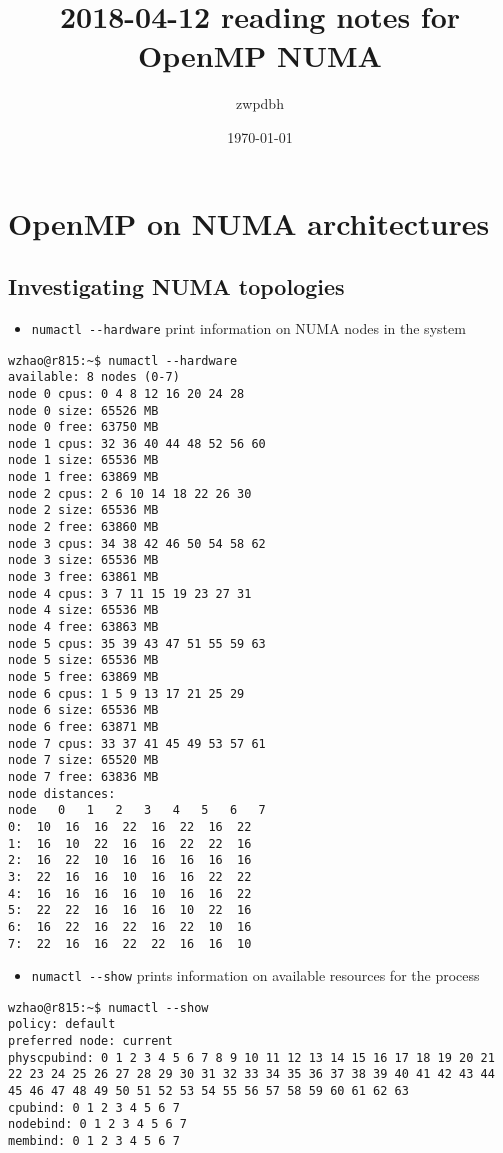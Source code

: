 \documentclass[11pt]{article}
\author{zwpdbh}
\date{\today}
\title{2018-04-12 reading notes for OpenMP NUMA}
\begin{document}
\maketitle
\tableofcontents


\section{OpenMP on NUMA architectures}
\label{sec-1}
\subsection{Investigating NUMA topologies}
\label{sec-1-1}
\begin{itemize}
\item \verb~numactl --hardware~ print information on NUMA nodes in the system
\end{itemize}
\begin{verbatim}
wzhao@r815:~$ numactl --hardware
available: 8 nodes (0-7)
node 0 cpus: 0 4 8 12 16 20 24 28
node 0 size: 65526 MB
node 0 free: 63750 MB
node 1 cpus: 32 36 40 44 48 52 56 60
node 1 size: 65536 MB
node 1 free: 63869 MB
node 2 cpus: 2 6 10 14 18 22 26 30
node 2 size: 65536 MB
node 2 free: 63860 MB
node 3 cpus: 34 38 42 46 50 54 58 62
node 3 size: 65536 MB
node 3 free: 63861 MB
node 4 cpus: 3 7 11 15 19 23 27 31
node 4 size: 65536 MB
node 4 free: 63863 MB
node 5 cpus: 35 39 43 47 51 55 59 63
node 5 size: 65536 MB
node 5 free: 63869 MB
node 6 cpus: 1 5 9 13 17 21 25 29
node 6 size: 65536 MB
node 6 free: 63871 MB
node 7 cpus: 33 37 41 45 49 53 57 61
node 7 size: 65520 MB
node 7 free: 63836 MB
node distances:
node   0   1   2   3   4   5   6   7 
0:  10  16  16  22  16  22  16  22 
1:  16  10  22  16  16  22  22  16 
2:  16  22  10  16  16  16  16  16 
3:  22  16  16  10  16  16  22  22 
4:  16  16  16  16  10  16  16  22 
5:  22  22  16  16  16  10  22  16 
6:  16  22  16  22  16  22  10  16 
7:  22  16  16  22  22  16  16  10
\end{verbatim}
\begin{itemize}
\item \verb~numactl --show~ prints information on available resources for the process
\end{itemize}
\begin{verbatim}
wzhao@r815:~$ numactl --show
policy: default
preferred node: current
physcpubind: 0 1 2 3 4 5 6 7 8 9 10 11 12 13 14 15 16 17 18 19 20 21 22 23 24 25 26 27 28 29 30 31 32 33 34 35 36 37 38 39 40 41 42 43 44 45 46 47 48 49 50 51 52 53 54 55 56 57 58 59 60 61 62 63 
cpubind: 0 1 2 3 4 5 6 7 
nodebind: 0 1 2 3 4 5 6 7 
membind: 0 1 2 3 4 5 6 7
\end{verbatim}
\end{document}
